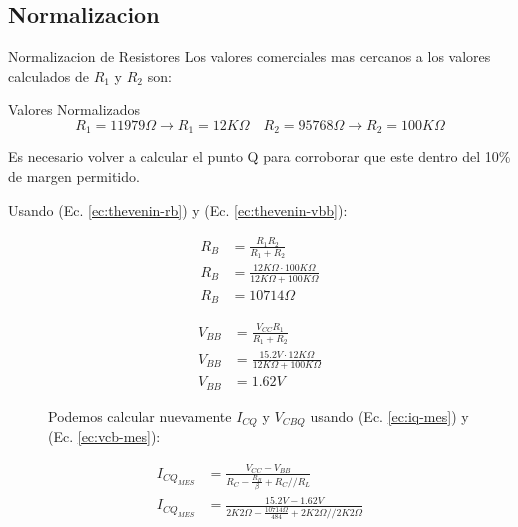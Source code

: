 \subsection{Normalizacion}
\begin{frame}[allowframebreaks]{Normalizacion de Resistores}
  Los valores comerciales mas cercanos a los valores calculados de $R_1$ y $R_2$ son:
  \begin{block}{Valores Normalizados}
    \begin{equation*}
      R_1 = 11979\Omega \to R_1 = 12K\Omega \quad R_2 = 95768\Omega \to R_2 = 100K\Omega
    \end{equation*}
  \end{block}
  Es necesario volver a calcular el punto Q para corroborar que este dentro del 10\% de margen permitido.

  Usando (Ec. \ref{ec:thevenin-rb}) y (Ec. \ref{ec:thevenin-vbb}):
  \begin{figure}[!ht]
    \begin{minipage}{0.45\textwidth}
      \begin{align*}
        R_B &= \frac{R_1 R_2}{R_1 + R_2}\\[6pt]
        R_B &= \frac{12K\Omega \cdot 100K\Omega}{12K\Omega + 100K\Omega}\\[6pt]
        R_B &= 10714\Omega
      \end{align*}
    \end{minipage}
    \hfill
    \begin{minipage}{0.45\textwidth}
      \begin{align*}
        V_{BB} &= \frac{V_{CC} R_1}{R_1 + R_2}\\[6pt]
        V_{BB} &= \frac{15.2V \cdot 12K\Omega}{12K\Omega + 100K\Omega}\\[6pt]
        V_{BB} &= 1.62V
      \end{align*}
    \end{minipage}
  \end{figure}
  \begin{figure}[!ht]
    Podemos calcular nuevamente $I_{CQ}$ y $V_{CBQ}$ usando (Ec. \ref{ec:iq-mes}) y (Ec. \ref{ec:vcb-mes}):
    \small
    \begin{minipage}{0.45\textwidth}
      \begin{align*}
        I_{CQ_{MES}} &= \frac{V_{CC} - V_{BB}}{R_C - \frac{R_B}{\beta} + R_C // R_L}\\[6pt]
        I_{CQ_{MES}} &= \frac{15.2V - 1.62V}{2K2\Omega - \frac{10714\Omega}{484} + 2K2\Omega // 2K2\Omega}\\[6pt]

\end{align*}
\end{minipage}
\end{figure}
\end{frame}
